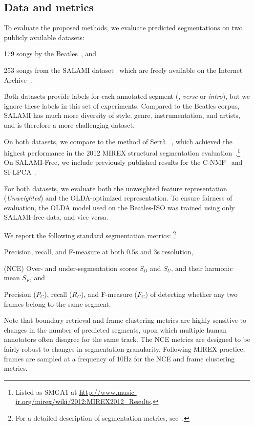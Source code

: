 \documentclass{article}
\begin{document}
\subsection{Data and metrics}
To evaluate the proposed methods, we evaluate predicted segmentations on two publicly available datasets:
\begin{description}\addtolength{\itemsep}{-0.25\baselineskip}%
\item[Beatles-ISO] 179 songs by the Beatles~\cite{harte2010towards}, and
\item[SALAMI-free] 253 songs from the SALAMI dataset~\cite{smith2011design} which are freely available on the 
Internet Archive~\cite{nieto2013convex}.
\end{description}
Both datasets provide labels for each annotated segment (\eg, \emph{verse} or \emph{intro}), but we ignore these
labels in this set of experiments. Compared to the Beatles corpus, SALAMI has much more diversity of style, genre, 
instrumentation, and artists, and is therefore a more challenging dataset.

On both datasets, we compare to the method of Serr\`{a} \etal~\cite{serra2012unsupervised}, which achieved the
highest performance in the 2012 MIREX structural segmentation evaluation~\cite{Downie2008}.\footnote{Listed as SMGA1
at \url{http://www.music-ir.org/mirex/wiki/2012:MIREX2012\_Results}.}  On SALAMI-Free, we include previously
published results for the C-NMF~\cite{nieto2013convex} and SI-LPCA~\cite{weiss2011unsupervised}.

For both datasets, we evaluate both the unweighted feature representation (\emph{Unweighted}) and the OLDA-optimized
representation. To ensure fairness of evaluation, the OLDA model used on the Beatles-ISO was trained using only
SALAMI-free data, and vice versa.

We report the following standard segmentation metrics:
\footnote{For a detailed description of segmentation metrics, see~\cite{mirexstructure}.}
\begin{description}\addtolength{\itemsep}{-0.25\baselineskip}%
\item[Boundary retrieval] Precision, recall, and F-measure at both 0.5s and 3s resolution,
\item[Normalized conditional entropy] (NCE) Over- and under-segmentation scores $S_O$ and $S_U$, and their harmonic
mean $S_F$, and
\item[Frame clustering] Precision ($P_C$), recall ($R_C$), and F-measure ($F_C$) of detecting whether any two frames 
belong to the same segment.
\end{description}
Note that boundary retrieval and frame clustering metrics are highly sensitive to changes in the number of
predicted segments, upon which multiple human annotators often disagree for the same track. 
The NCE metrics are designed to be fairly robust to changes in segmentation granularity.
Following MIREX practice, frames are sampled at a frequency of 10Hz for the NCE and frame clustering metrics. 
\end{document}
